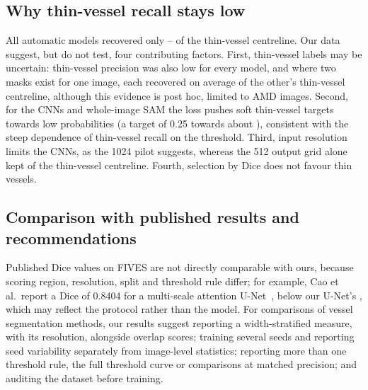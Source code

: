 \subsection*{Why thin-vessel recall stays low}
All automatic models recovered only \AllThinMin--\AllThinMax{} of the thin-vessel centreline. Our data suggest, but do not
test, four contributing factors. First, thin-vessel labels may be uncertain: thin-vessel precision was also low for every
model, and where two masks exist for one image, each
recovered on average \AgreeThinMean{} of the other's thin-vessel centreline, although this evidence is post hoc, limited to
\AgreeNPairs{} AMD images. Second, for the CNNs and whole-image SAM the loss pushes soft
thin-vessel targets towards low probabilities (a target of 0.25 towards about \LossOptQuarter), consistent with the steep
dependence of thin-vessel recall on the threshold. Third, input resolution limits the CNNs, as the 1024 pilot suggests,
whereas the 512 output grid alone kept \RefFiveThin{} of the thin-vessel centreline. Fourth, selection by Dice does not
favour thin vessels.

\subsection*{Comparison with published results and recommendations}
Published Dice values on FIVES are not directly comparable with ours, because scoring region, resolution, split and
threshold rule differ; for example, Cao et al.\ report a Dice of 0.8404 for a multi-scale attention
U-Net~\cite{cao2023mfaunet}, below our U-Net's \UNetDiceMean, which may reflect the protocol rather than the model. For
comparisons of vessel segmentation methods, our results suggest reporting a width-stratified measure, with its resolution,
alongside overlap scores; training several seeds and reporting seed variability separately from image-level statistics;
reporting more than one threshold rule, the full threshold curve or comparisons at matched precision; and auditing the
dataset before training.

